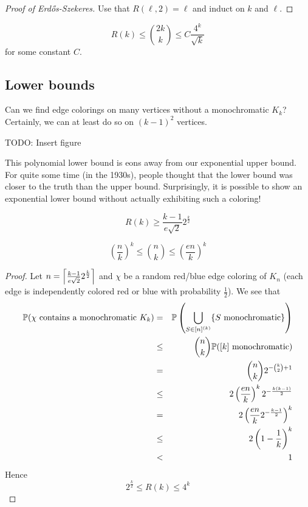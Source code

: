 \documentclass{article}
\begin{document}
\begin{proof}[Proof of Erd\H os-Szekeres]
  Use that $R(\ell, 2) = \ell$ and induct on $k$ and $\ell$.
\end{proof}

\begin{cor}
  $$R(k) \le \binom{2k} k \le C\frac{4^k}{\sqrt k}$$
  for some constant $C$.
\end{cor}

\subsection{Lower bounds}

Can we find edge colorings on many vertices without a monochromatic $K_k$?
Certainly, we can at least do so on $(k - 1)^2$ vertices.

TODO: Insert figure

This polynomial lower bound is eons away from our exponential upper bound. For quite some time (in the 1930s), people thought that the lower bound was closer to the truth than the upper bound. Surprisingly, it is possible to show an exponential lower bound without actually exhibiting such a coloring!

\begin{thm}[Erd\H os, 1948]
  $$R(k) \ge \frac{k - 1}{e\sqrt 2}2^{\frac k 2}$$
\end{thm}
\begin{fact}
  $$\left(\frac n k\right)^k \le \binom n k \le \left(\frac{en}k\right)^k$$
\end{fact}
\begin{proof}
  Let $n = \ceil{\frac{k - 1}{e\sqrt 2}2^{\frac k 2}}$ and $\chi$ be a random red/blue edge coloring of $K_n$ (each edge is independently colored red or blue with probability $\frac 1 2$). We see that
  \begin{eqnarray*}
    \P(\chi \text{ contains a monochromatic } K_k)
    & = & \P\left(\bigcup_{S \in [n]^{(k)}} \{S \text{ monochromatic}\}\right) \\
    & \le & \binom n k \P([k] \text{ monochromatic}) \\
    & = & \binom n k 2^{-\binom k 2 + 1} \\
    & \le & 2 \left(\frac{en}k\right)^k 2^{-\frac{k(k - 1)}2} \\
    & = & 2 \left(\frac{en}k 2^{-\frac{k - 1}2}\right)^k \\
    & \le & 2\left(1 - \frac 1 k\right)^k \\
    & < & 1
  \end{eqnarray*}
  Hence
  $$2^{\frac k 2} \le R(k) \le 4^k$$
\end{proof}
\end{document}
